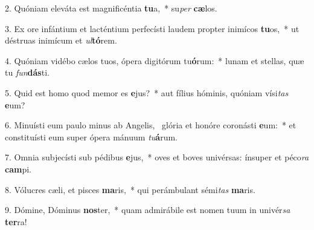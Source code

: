 2. Quóniam eleváta est magnificéntia \textbf{tu}a,~*  su\textit{per} \textbf{cæ}los.\

3. Ex ore infántium et lacténtium perfecísti laudem propter inimícos \textbf{tu}os,~*  ut déstruas inimícum et \textit{ul}\textbf{tó}rem.\

4. Quóniam vidébo cælos tuos, ópera digitórum tu\textbf{ó}rum:~*  lunam et stellas, quæ tu \textit{fun}\textbf{dás}ti.\

5. Quid est homo quod memor es \textbf{e}jus?~*  aut fílius hóminis, quóniam vísi\textit{tas} \textbf{e}um?\

6. Minuísti eum paulo minus ab Angelis, \dag\  glória et honóre coronásti \textbf{e}um:~*  et constituísti eum super ópera mánuum \textit{tu}\textbf{á}rum.\

7. Omnia subjecísti sub pédibus \textbf{e}jus,~*  oves et boves univérsas: ínsuper et péco\textit{ra} \textbf{cam}pi.\

8. Vólucres cæli, et pisces \textbf{ma}ris,~*  qui perámbulant sémi\textit{tas} \textbf{ma}ris.\

9. Dómine, Dóminus \textbf{nos}ter,~*  quam admirábile est nomen tuum in univér\textit{sa} \textbf{ter}ra!\

